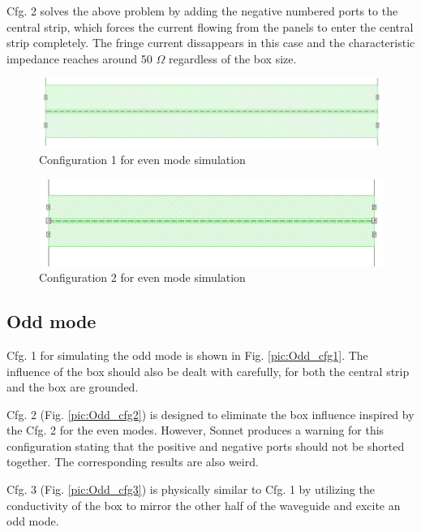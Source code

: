 \documentclass[noshowpacs,amsmath,
superscriptaddress,
10pt]{article}
\begin{document}
Cfg. 2 solves the above problem by adding the negative numbered ports to the central strip, which forces the current flowing from the panels to enter the central strip completely. The fringe current dissappears in this case and the characteristic impedance reaches around 50 $\Omega$ regardless of the box size. 

\begin{figure}[!ht]
\centering
\includegraphics[width=15cm] {Even_cfg1}
\caption{Configuration 1 for even mode simulation}
\label{pic:Even_cfg1}
\end{figure}

\begin{figure}[!ht]
\centering
\includegraphics[width=15cm] {Even_cfg2}
\caption{Configuration 2 for even mode simulation}
\label{pic:Even_cfg2}
\end{figure}


\subsection{Odd mode}

Cfg. 1 for simulating the odd mode is shown in Fig. \ref{pic:Odd_cfg1}. The influence of the box should also be dealt with carefully, for both the central strip and the box are grounded. 

Cfg. 2 (Fig. \ref{pic:Odd_cfg2}) is designed to eliminate the box influence inspired by the Cfg. 2 for the even modes. However, Sonnet produces a warning for this configuration stating that the positive and negative ports should not be shorted together. The corresponding results are also weird. 

Cfg. 3 (Fig. \ref{pic:Odd_cfg3}) is physically similar to Cfg. 1 by utilizing the conductivity of the box to mirror the other half of the waveguide and excite an odd mode. 
\end{document}
